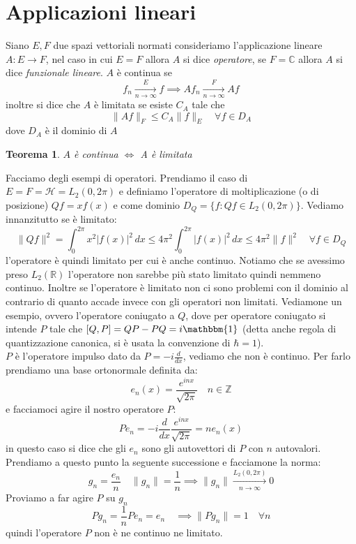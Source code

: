 \documentclass[12pt]{book}
\theoremstyle{plain}
\newcommand{\R}{\mathbb{R}}
\newcommand{\C}{\mathbb{C}}
\renewcommand{\H}{\mathcal{H}}
\newtheorem{thm}{Teorema}[section]
\theoremstyle{definition}
\theoremstyle{remark}
\begin{document}
\section{Applicazioni lineari}
Siano $E,F$ due spazi vettoriali normati consideriamo l'applicazione lineare $A:E\to F$, nel caso in cui $E=F$ allora $A$ si dice \emph{operatore}, se $F=\C$ allora $A$ si dice \emph{funzionale lineare}. $A$ è continua se 
\[f_n \xrightarrow[n\to \infty]{E}f \implies Af_n \xrightarrow[n\to \infty]{F}Af\]
inoltre si dice che $A$ è limitata se esiste $C_A$ tale che
\[\|Af\|_F \leq C_A \|f\|_E\quad \forall f\in D_A\]
dove $D_A$ è il dominio di $A$
\begin{thm}
$A$ è continua $\iff$ A è limitata
\end{thm}
\hspace{-1.6em}Facciamo degli esempi di operatori. Prendiamo il caso di $E=F=\H = L_2(0,2\pi)$ e definiamo l'operatore di moltiplicazione (o di posizione) $Qf = xf(x)$ e come dominio $D_Q = \{f : Qf\in L_2(0,2\pi)\}$. Vediamo innanzitutto se è limitato:
\[\|Qf\|^2 = \int_0^{2\pi} x^2 |f(x)|^2\,dx\leq 4\pi^2 \int_0^{2\pi}|f(x)|^2\,dx\leq 4\pi^2 \|f\|^2 \quad \forall f\in D_Q\]
l'operatore è quindi limitato per cui è anche continuo. Notiamo che se avessimo preso $L_2(\R)$ l'operatore non sarebbe più stato limitato quindi nemmeno continuo. Inoltre se l'operatore è limitato non ci sono problemi con il dominio al contrario di quanto accade invece con gli operatori non limitati. Vediamone un esempio, ovvero l'operatore coniugato a $Q$, dove per operatore coniugato si intende $P$ tale che $[Q,P] = QP-PQ = i\mathbbm{1}$ (detta anche regola di quantizzazione canonica, si è usata la convenzione di $\hbar =1$).\\
$P$ è l'operatore impulso dato da $P = -i\frac{d}{dx}$, vediamo che non è continuo. Per farlo prendiamo una base ortonormale definita da:
\[e_n(x) = \frac{e^{inx}}{\sqrt{2\pi}}\quad n\in \mathbb{Z}\]
e facciamoci agire il nostro operatore $P$:
\[Pe_n = -i \frac{d}{dx}\frac{e^{inx}}{\sqrt{2\pi}} = ne_n(x)\]
in questo caso si dice che gli $e_n$ sono gli autovettori di $P$ con $n$ autovalori. Prendiamo a questo punto la seguente successione e facciamone la norma:
\[g_n = \frac{e_n}{n} \quad \|g_n\| = \frac{1}{n} \implies \|g_n\|  \xrightarrow[n\to \infty]{L_2(0,2\pi)}0 \]
Proviamo a far agire $P$ su $g_n$
\[Pg_n = \frac{1}{n}Pe_n = e_n \quad \implies \|Pg_n\| = 1\quad \forall n\]
quindi l'operatore $P$ non è ne continuo ne limitato.\\
\newline
\end{document}
